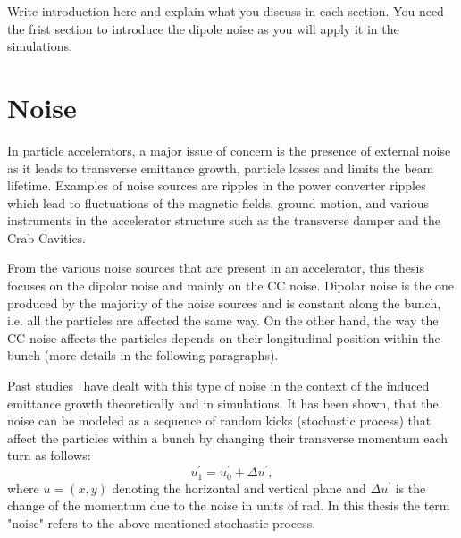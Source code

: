 Write introduction here and explain what you discuss in each section.
You need the frist section to introduce the dipole noise as you will apply it in the simulations.
\section{Noise}\label{sec:noise_definition}
In particle accelerators, a major issue of concern is the presence of external noise as it leads to transverse emittance growth, particle losses and limits the beam lifetime. Examples of noise sources are ripples in the power converter ripples which lead to fluctuations of the magnetic fields, ground motion, and various instruments in the accelerator structure such as the transverse damper and the Crab Cavities. %

From the various noise sources that are present in an accelerator, this thesis focuses on the dipolar noise and mainly on the CC noise. Dipolar noise is the one produced by the majority of the noise sources and is constant along the bunch, i.e. all the particles are affected the same way. %
On the other hand, the way the CC noise affects the particles depends on their longitudinal position within the bunch (more details in the following paragraphs).

Past studies~\cite{Lebedev:248620, Lebedev:248622, PhysRevSTAB.18.101001} have dealt with this type of noise in the context of the induced emittance growth theoretically and in simulations. It has been shown, that the noise can be modeled as a sequence of random kicks (stochastic process) that affect the particles within a bunch by changing their transverse momentum each turn as follows:
\begin{equation}\label{eq:external_noise}
    u^\prime_1 =  u^\prime_0 + \Delta u^\prime,
\end{equation}
where $u=(x,y)$ denoting the horizontal and vertical plane and $\Delta u^\prime$ is the change of the momentum due to the noise in units of rad. In this thesis the term "noise" refers to the above mentioned stochastic process.

